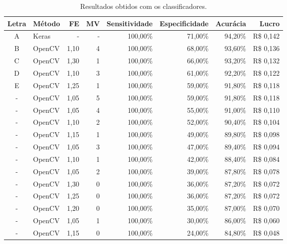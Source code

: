 \begin{table}[htbp]
    \caption{Resultados obtidos com os classificadores.}
    \label{tab:results_identify}
    \centering
    \begin{tabular}{clrrrrrr}
        Letra & Método & FE   & MV & Sensitividade & Especificidade & Acurácia & Lucro      \\
        \midrule
        A     & Keras  & -    & -  & 100,00\%      & 71,00\%        & 94,20\%  & R\$ 0,142  \\
        B     & OpenCV & 1,10 & 4  & 100,00\%      & 68,00\%        & 93,60\%  & R\$ 0,136  \\
        C     & OpenCV & 1,30 & 1  & 100,00\%      & 66,00\%        & 93,20\%  & R\$ 0,132  \\
        D     & OpenCV & 1,10 & 3  & 100,00\%      & 61,00\%        & 92,20\%  & R\$ 0,122  \\
        E     & OpenCV & 1,25 & 1  & 100,00\%      & 59,00\%        & 91,80\%  & R\$ 0,118  \\
        -     & OpenCV & 1,05 & 5  & 100,00\%      & 59,00\%        & 91,80\%  & R\$ 0,118  \\
        -     & OpenCV & 1,05 & 4  & 100,00\%      & 55,00\%        & 91,00\%  & R\$ 0,110  \\
        -     & OpenCV & 1,10 & 2  & 100,00\%      & 52,00\%        & 90,40\%  & R\$ 0,104  \\
        -     & OpenCV & 1,15 & 1  & 100,00\%      & 49,00\%        & 89,80\%  & R\$ 0,098  \\
        -     & OpenCV & 1,05 & 3  & 100,00\%      & 47,00\%        & 89,40\%  & R\$ 0,094  \\
        -     & OpenCV & 1,10 & 1  & 100,00\%      & 42,00\%        & 88,40\%  & R\$ 0,084  \\
        -     & OpenCV & 1,05 & 2  & 100,00\%      & 39,00\%        & 87,80\%  & R\$ 0,078  \\
        -     & OpenCV & 1,30 & 0  & 100,00\%      & 36,00\%        & 87,20\%  & R\$ 0,072  \\
        -     & OpenCV & 1,25 & 0  & 100,00\%      & 36,00\%        & 87,20\%  & R\$ 0,072  \\
        -     & OpenCV & 1,20 & 0  & 100,00\%      & 35,00\%        & 87,00\%  & R\$ 0,070  \\
        -     & OpenCV & 1,05 & 1  & 100,00\%      & 30,00\%        & 86,00\%  & R\$ 0,060  \\
        -     & OpenCV & 1,15 & 0  & 100,00\%      & 24,00\%        & 84,80\%  & R\$ 0,048  \\

\end{tabular}
\end{table}
